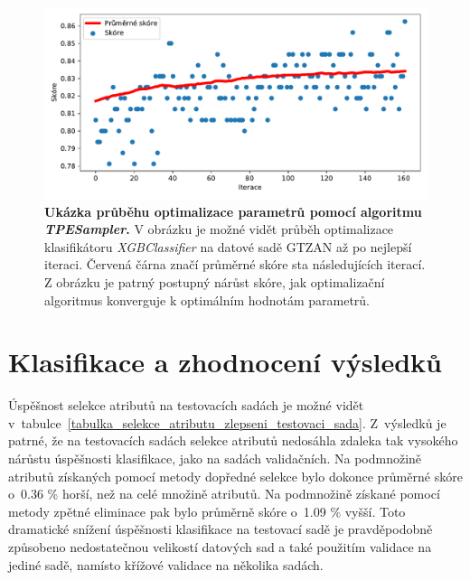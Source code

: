 \begin{figure}[h]
    \centering
    \includegraphics[width=\textwidth]{obrazky/TPESampler_optimisation.pdf}
    \caption{\textbf{Ukázka průběhu optimalizace parametrů pomocí algoritmu \textit{TPESampler}.} V obrázku je možné vidět průběh optimalizace klasifikátoru \textit{XGBClassifier} na datové sadě GTZAN až po nejlepší iteraci. Červená čárna značí průměrné skóre sta následujících iterací. Z obrázku je patrný postupný nárůst skóre, jak optimalizační algoritmus konverguje k optimálním hodnotám parametrů.}
    \label{obr_TPE_optimalizace}
\end{figure}

\chapter{Klasifikace a zhodnocení výsledků}
\label{klasifikace_a_zhodnoceni_vysledku}

Úspěšnost selekce atributů na testovacích sadách je možné vidět v~tabulce~\ref{tabulka_selekce_atributu_zlepseni_testovaci_sada}. Z~výsledků je patrné, že na testovacích sadách selekce atributů nedosáhla zdaleka tak vysokého nárůstu úspěšnosti klasifikace, jako na sadách validačních. Na podmnožině atributů získaných pomocí metody dopředné selekce bylo dokonce průměrné skóre o~0.36 \% horší, než na celé množině atributů. Na podmnožině získané pomocí metody zpětné eliminace pak bylo průměrně skóre o~1.09 \% vyšší. Toto dramatické snížení úspěšnosti klasifikace na testovací sadě je pravděpodobně způsobeno nedostatečnou velikostí datových sad a také použitím validace na jediné sadě, namísto křížové validace na několika sadách. 

